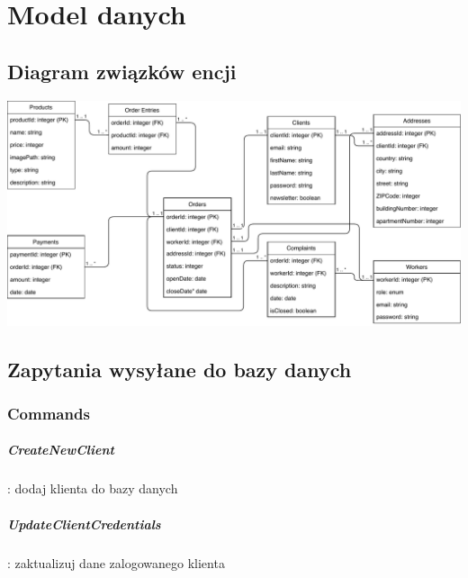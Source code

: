 \documentclass[10pt]{report}
\begin{document}
	
	

	\renewcommand{\thesection}{\thechapter.\arabic{section}}		
	
\chapter{Model danych}
	
	\section{Diagram związków encji}
		\includegraphics[width=500pt]{database.pdf}
		 
		
	\section{Zapytania wysyłane do bazy danych}
	
		\subsection{Commands}
		
				\paragraph{CreateNewClient} : dodaj klienta do bazy danych 
				
				\paragraph{UpdateClientCredentials} : zaktualizuj dane zalogowanego klienta
				
\end{document}
